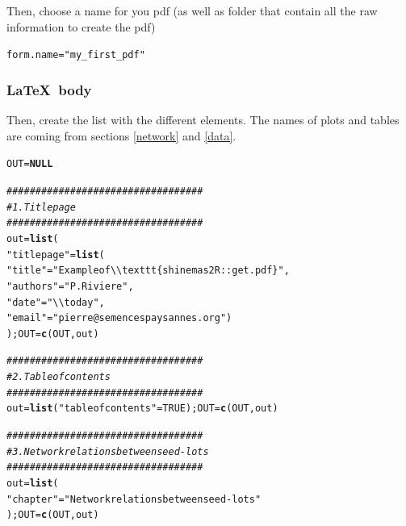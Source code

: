 \documentclass{article}\usepackage[]{graphicx}\usepackage[]{color}
\makeatletter
\newcommand{\hlnum}[1]{\textcolor[rgb]{0.686,0.059,0.569}{#1}}%
\newcommand{\hlstr}[1]{\textcolor[rgb]{0.192,0.494,0.8}{#1}}%
\newcommand{\hlcom}[1]{\textcolor[rgb]{0.678,0.584,0.686}{\textit{#1}}}%
\newcommand{\hlstd}[1]{\textcolor[rgb]{0.345,0.345,0.345}{#1}}%
\newcommand{\hlkwa}[1]{\textcolor[rgb]{0.161,0.373,0.58}{\textbf{#1}}}%
\newcommand{\hlkwb}[1]{\textcolor[rgb]{0.69,0.353,0.396}{#1}}%
\newcommand{\hlkwd}[1]{\textcolor[rgb]{0.737,0.353,0.396}{\textbf{#1}}}%
\newenvironment{kframe}{%
 \def\at@end@of@kframe{}%
 \ifinner\ifhmode%
  \def\at@end@of@kframe{\end{minipage}}%
  \begin{minipage}{\columnwidth}%
 \fi\fi%
 \def\FrameCommand##1{\hskip\@totalleftmargin \hskip-\fboxsep
 \colorbox{shadecolor}{##1}\hskip-\fboxsep
     \hskip-\linewidth \hskip-\@totalleftmargin \hskip\columnwidth}%
 \MakeFramed {\advance\hsize-\width
   \@totalleftmargin\z@ \linewidth\hsize
   \@setminipage}}%
 {\par\unskip\endMakeFramed%
 \at@end@of@kframe}
\newenvironment{knitrout}{}{} %
\makeatother
\begin{document}
\begin{itemize}
Then, choose a name for you pdf (as well as folder that contain all the raw information to create the pdf) 
\begin{knitrout}
\color{fgcolor}\begin{kframe}
\begin{alltt}
\hlstd{form.name} \hlkwb{=} \hlstr{"my_first_pdf"}
\end{alltt}
\end{kframe}
\end{knitrout}

\subsubsection{\LaTeX~body}

Then, create the list with the different elements.
The names of plots and tables are coming from sections \ref{network} and \ref{data}.


\begin{knitrout}
\color{fgcolor}\begin{kframe}
\begin{alltt}
\hlstd{OUT} \hlkwb{=} \hlkwa{NULL}

\hlcom{##################################}
\hlcom{# 1. Title page }
\hlcom{##################################}
\hlstd{out} \hlkwb{=} \hlkwd{list}\hlstd{(}
        \hlstr{"titlepage"} \hlstd{=} \hlkwd{list}\hlstd{(}
                \hlstr{"title"} \hlstd{=} \hlstr{"Example of \textbackslash{}\textbackslash{}texttt\{shinemas2R::get.pdf\}"}\hlstd{,}
                \hlstr{"authors"} \hlstd{=} \hlstr{"P. Riviere"}\hlstd{,}
                \hlstr{"date"} \hlstd{=} \hlstr{"\textbackslash{}\textbackslash{}today"}\hlstd{,}
                \hlstr{"email"} \hlstd{=} \hlstr{"pierre@semencespaysannes.org"}\hlstd{)}
        \hlstd{); OUT} \hlkwb{=} \hlkwd{c}\hlstd{(OUT, out)}


\hlcom{##################################}
\hlcom{# 2. Table of contents}
\hlcom{##################################}
\hlstd{out} \hlkwb{=} \hlkwd{list}\hlstd{(}\hlstr{"tableofcontents"} \hlstd{=} \hlnum{TRUE}\hlstd{); OUT} \hlkwb{=} \hlkwd{c}\hlstd{(OUT, out)}


\hlcom{##################################}
\hlcom{# 3. Network relations between seed-lots}
\hlcom{##################################}
\hlstd{out} \hlkwb{=} \hlkwd{list}\hlstd{(}
        \hlstr{"chapter"} \hlstd{=} \hlstr{"Network relations between seed-lots"}
        \hlstd{); OUT} \hlkwb{=} \hlkwd{c}\hlstd{(OUT, out)}


\end{alltt}
\end{kframe}
\end{knitrout}
\end{itemize}
\end{document}

